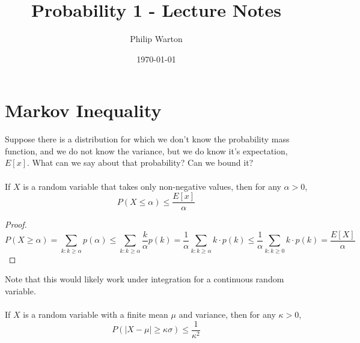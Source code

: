 \documentclass{article}
\begin{document}
\title{Probability 1 - Lecture Notes}
\author{Philip Warton}
\date{\today}
\maketitle
\section{Markov Inequality}
    Suppose there is a distribution for which we don't know the probability mass function, and we do not know the variance, but we do know it's expectation, $E[x]$.
    What can we say about that probability?
    Can we bound it? \\\\
     If $X$ is a random variable that takes only non-negative values, then for any $\alpha > 0$,
    \[
        P(X \leq \alpha) \leqslant \frac{E[x]}{\alpha}
    \]
    \begin{proof}
    \[
    P(X \geq \alpha) = \sum_{k : k \geq \alpha} p(\alpha) \leq \sum_{k : k \geq \alpha}\frac{k}{\alpha}p(k) = \frac{1}{\alpha}\sum_{k : k \geq \alpha}k\cdot p(k) \leq \frac{1}{\alpha} \sum_{k : k \geq 0}k \cdot p(k) = \frac{E[X]}{\alpha}
    \]
    \end{proof}
    Note that this would likely work under integration for a continuous random variable.\\\\
     If $X$ is a random variable with a finite mean $\mu$ and variance, then for any $\kappa > 0$,
    \[
        P(|X- \mu | \geq \kappa \sigma) \leq \frac{1}{\kappa^2}
    \]
\end{document}
